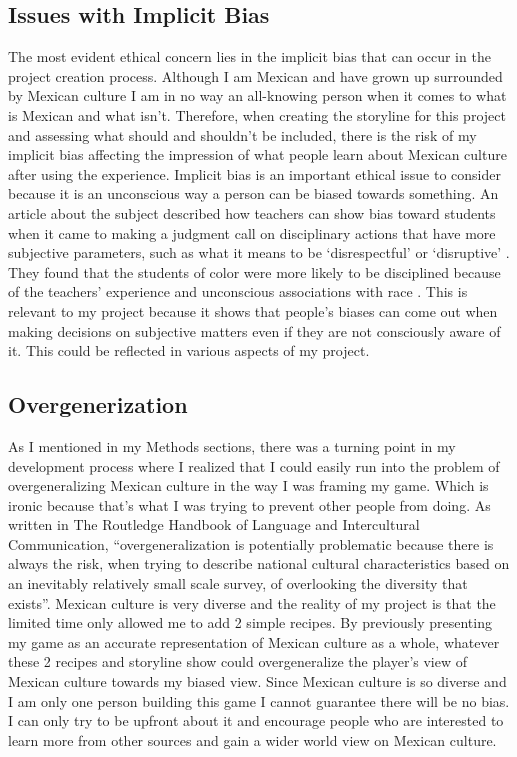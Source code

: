 \documentclass[10pt,twocolumn]{article}
\begin{document}
\subsection{Issues with Implicit Bias}
The most evident ethical concern lies in the implicit bias that can occur in the project creation process. Although I am Mexican and have grown up surrounded by Mexican culture I am in no way an all-knowing person when it comes to what is Mexican and what isn’t. Therefore, when creating the storyline for this project and assessing what should and shouldn’t be included, there is the risk of my implicit bias affecting the impression of what people learn about Mexican culture after using the experience. Implicit bias is an important ethical issue to consider because it is an unconscious way a person can be biased towards something. An article about the subject described how teachers can show bias toward students when it came to making a judgment call on disciplinary actions that have more subjective parameters, such as what it means to be ‘disrespectful’ or ‘disruptive’ \cite{implicitbias201516}. They found that the students of color were more likely to be disciplined because of the teachers’ experience and unconscious associations with race \cite{implicitbias201516}. This is relevant to my project because it shows that people's biases can come out when making decisions on subjective matters even if they are not consciously aware of it. This could be reflected in various aspects of my project. 

\subsection{Overgenerization}
As I mentioned in my Methods sections, there was a turning point in my development process where I realized that I could easily run into the problem of overgeneralizing Mexican culture in the way I was framing my game. Which is ironic because that’s what I was trying to prevent other people from doing. As written in The Routledge Handbook of Language and Intercultural Communication, “overgeneralization is potentially problematic because there is always the risk, when trying to describe national cultural characteristics based on an inevitably relatively small scale survey, of overlooking the diversity that exists”\cite{overGen2020}. Mexican culture is very diverse and the reality of my project is that the limited time only allowed me to add 2 simple recipes. By previously presenting my game as an accurate representation of Mexican culture as a whole, whatever these 2 recipes and storyline show could overgeneralize the player's view of Mexican culture towards my biased view. Since Mexican culture is so diverse and I am only one person building this game I cannot guarantee there will be no bias. I can only try to be upfront about it and encourage people who are interested to learn more from other sources and gain a wider world view on Mexican culture. 
\end{document}
